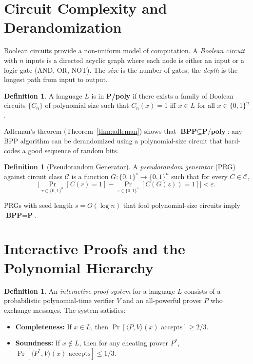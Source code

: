 \documentclass[twoside,12pt]{book}
\theoremstyle{plain}
\theoremstyle{definition}
\newtheorem{definition}[theorem]{Definition}
\theoremstyle{remark}
\begin{document}
\section{Circuit Complexity and Derandomization}
\label{app:sec:circuits}

Boolean circuits provide a non-uniform model of computation. A
\emph{Boolean circuit} with $n$ inputs is a directed acyclic graph where
each node is either an input or a logic gate (AND, OR, NOT). The \emph{size}
is the number of gates; the \emph{depth} is the longest path from input
to output.

\begin{definition}
A language $L$ is in \textbf{P/poly} if there exists a family of Boolean
circuits $\{C_n\}$ of polynomial size such that $C_n(x) = 1$ iff $x \in L$
for all $x \in \{0,1\}^n$.
\end{definition}

Adleman's theorem (Theorem~\ref{thm:adleman}) shows that
$\textbf{BPP} \subseteq \textbf{P/poly}$: any BPP algorithm can be
derandomized using a polynomial-size circuit that hard-codes a good
sequence of random bits.

\begin{definition}[Pseudorandom Generator]
A \emph{pseudorandom generator} (PRG) against circuit class $\mathcal{C}$
is a function $G: \{0,1\}^s \to \{0,1\}^n$ such that for every
$C \in \mathcal{C}$,
\[
\bigl|\Pr_{r \in \{0,1\}^n}[C(r) = 1] -
\Pr_{z \in \{0,1\}^s}[C(G(z)) = 1]\bigr| < \varepsilon.
\]
\end{definition}

PRGs with seed length $s = O(\log n)$ that fool polynomial-size circuits
imply $\textbf{BPP} = \textbf{P}$.

\section{Interactive Proofs and the Polynomial Hierarchy}
\label{app:sec:interactive}

\begin{definition}
An \emph{interactive proof system} for a language $L$ consists of a
probabilistic polynomial-time verifier $V$ and an all-powerful prover $P$
who exchange messages. The system satisfies:
\begin{itemize}
\item \textbf{Completeness:} If $x \in L$, then $\Pr[\langle P,V\rangle(x)
      \text{ accepts}] \geq 2/3$.
\item \textbf{Soundness:} If $x \notin L$, then for any cheating prover $P^*$,
      $\Pr[\langle P^*,V\rangle(x) \text{ accepts}] \leq 1/3$.
\end{itemize}
\end{definition}
\end{document}
